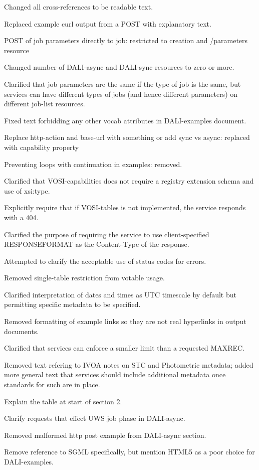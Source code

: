\documentclass[11pt,letter]{ivoa}
\begin{document}
Changed all cross-references to be readable text.

Replaced example curl output from a POST with explanatory text.

POST of job parameters directly to job: restricted to creation and /parameters
resource

Changed number of DALI-async and DALI-sync resources to zero or more.

Clarified that job parameters are the same if the type of job is the same, but
services can have different types of jobs (and hence different parameters) on
different job-list resources.

Fixed text forbidding any other vocab attributes in DALI-examples document.

Replace http-action and base-url with something or add sync vs async: replaced
with capability property

Preventing loops with continuation in examples: removed.

Clarified that VOSI-capabilities does not require a registry extension schema
and use of xsi:type.

Explicitly require that if VOSI-tables is not implemented, the service responds
with a 404.

Clarified the purpose of requiring the service to use client-specified
RESPONSEFORMAT as the Content-Type of the response.

Attempted to clarify the acceptable use of status codes for errors.

Removed single-table restriction from votable usage.

Clarified interpretation of dates and times as UTC timescale by default but
permitting specific metadata to be specified.

Removed formatting of example links so they are not real hyperlinks in output
documents.

Clarified that services can enforce a smaller limit than a requested MAXREC.

Removed text refering to IVOA notes on STC and Photometric metadata; added more
general text that services should include additional metadata once standards for
such are in place.

Explain the table at start of section 2.

Clarify requests that effect UWS job phase in DALI-async.

Removed malformed http post example from DALI-async section.

Remove reference to SGML specifically, but mention HTML5 as a poor choice for
DALI-examples.
\end{document}
